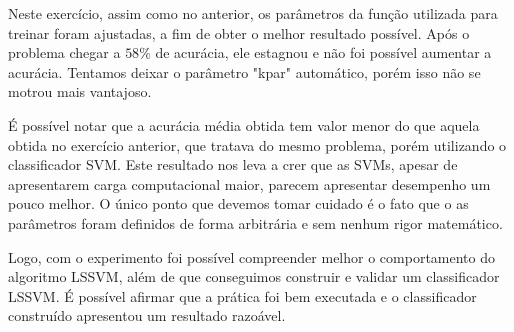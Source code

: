 \documentclass[12pt]{article}
\begin{document}
  \par Neste exercício, assim como no anterior, os parâmetros da função utilizada para treinar foram ajustadas, a fim de obter o melhor resultado possível. Após o problema chegar a $58\%$ de acurácia, ele estagnou e não foi possível aumentar a acurácia. Tentamos deixar o parâmetro "kpar" automático, porém isso não se motrou mais vantajoso. 
  
  \par É possível notar que a acurácia média obtida tem valor menor do que aquela obtida no exercício anterior, que tratava do mesmo problema, porém utilizando o classificador SVM. Este resultado nos leva a crer que as SVMs, apesar de apresentarem carga computacional maior, parecem apresentar desempenho um pouco melhor. O único ponto que devemos tomar cuidado é o fato que o as parâmetros foram definidos de forma arbitrária e sem nenhum rigor matemático.
  
  \par Logo, com o experimento foi possível compreender melhor o comportamento do algoritmo LSSVM, além de que conseguimos construir e validar um classificador LSSVM. É possível afirmar que a prática foi bem executada e o classificador construído apresentou um resultado razoável.
  

\end{document}
